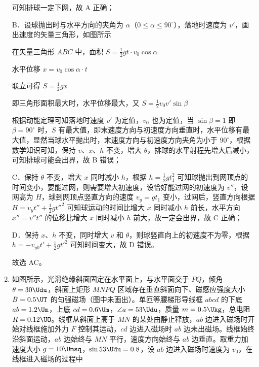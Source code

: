 \documentclass[\gkver]{gaokaozhenti}
\begin{document}
\begin{enumerate}
{可知排球一定下网，故 A 正确；

B．设球抛出时与水平方向的夹角为 $ \alpha $（$ 0 \leq \alpha \leq 90^\circ $），落地时速度为 $ v' $，画出速度的矢量三角形，如图所示


在矢量三角形 $ ABC $ 中，面积 $ S = \frac{1}{2} g t \cdot v_0 \cos \alpha $

水平位移 $ x = v_0 \cos \alpha \cdot t $

联立可得 $ S = \frac{1}{2} g x $

即三角形面积最大时，水平位移最大，又 $ S = \frac{1}{2} v_0 v' \sin \beta $

根据动能定理可知落地时速度 $ v' $ 为定值，$ v_0 $ 也为定值，当 $ \sin \beta = 1 $ 即 $ \beta = 90^\circ $ 时，$ S $ 有最大值，即末速度方向与初速度方向垂直时，水平位移有最大值，显然当球水平抛出时，末速度方向与初速度方向夹角为小于 $ 90^\circ $，根据数学知识可知，保持 $ v $、$ x $、$ h $ 不变，增大 $ \theta $，排球的水平射程先增大后减小，可知排球可能会出界，故 B 错误；

C．保持 $ \theta $ 不变，增大 $ x $ 同时减小 $ h $，根据 $ h = \frac{1}{2} g t_1^2 $ 可知球抛出到网顶点的时间变小，要能过网，则需要增大初速度，设恰好能过网的初速度为 $ v'' $，设网高为 $ H $，球到网顶点竖直方向的速度 $ v_y = g t_1 $ 变小，过网后，竖直方向根据 $ H = v_y t'' + \frac{1}{2} g t''^2 $ 可知球运动的时间比增大 $ x $ 同时减小 $ h $ 前长，水平方向 $ x'' = v'' t'' $ 的位移比增大 $ x $ 同时减小 $ h $ 前大，故一定会出界，故 C 正确；

D．保持 $ x $、$ h $ 不变，同时增大 $ v $ 和 $ \theta $，则球竖直向上的初速度不为零，根据 $ h = -v_{y0} t' + \frac{1}{2} g t'^2 $ 可知时间变大，故 D 错误。

故选 AC。
}
\item
如图所示，光滑绝缘斜面固定在水平面上，与水平面交于 $ PQ $，倾角 $ \theta =30 \Udu $，斜面上矩形 $ MNPQ $ 区域存在垂直斜面向下、磁感应强度大小 $ B =0.5\UT $ 的匀强磁场（图中未画出）。单匝等腰梯形导线框 $ abcd $ 的下底 $ ab=1.2 \Um $，上底 $ cd=0.6 \Um $，$ \angle a=53 \Udu $，质量 $ m =0.5 \Ukg $，总电阻 $ R =0.12 \UO $。线框从斜面上高于 $ MN $ 的某处由静止释放，$ ab $ 边进入磁场时开始对线框施加外力 $ F $ 控制其运动，$ cd $ 边进入磁场时 $ ab $ 边未出磁场。线框始终沿斜面运动，$ ab $ 边始终与 $ MN $ 平行，速度方向始终与 $ ab $ 边垂直。取重力加速度大小 $ g =10 \Umsq $，$ \sin 53 \Udu =0.8 $，设 $ ab $ 边进入磁场时速度为 $ v_{0} $，在线框进入磁场的过程中 
\onepicture[w=7.64cm, h=5.72cm]{}


\end{enumerate}
\end{document}
